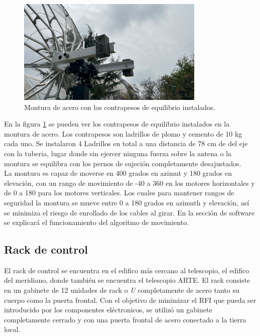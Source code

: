 \begin{figure}
    \centering
    \includegraphics[width=0.8\textwidth]{img/contrapesos}
    \caption{Montura de acero con los contrapesos de equilibrio instalados.}
    \label{fig:ensamble11}
\end{figure}

En la figura \ref{fig:ensamble11} se pueden ver los contrapesos de equilibrio instalados en la montura de acero. Los contrapesos son ladrillos de plomo y cemento de 10 kg cada uno. Se instalaron 4 Ladrillos en total a una distancia de 78 cm de del eje con la tuberia, lugar donde sin ejercer ninguna fuerza sobre la antena o la montura se equilibra con los pernos de sujeción completamente desajustados.\\

La montura es capaz de moverse en 400 grados en azimut y 180 grados en elevación, con un rango de movimiento de -40 a 360 en los motores horizontales y de 0 a 180 para los motores verticales. Los cuales para mantener rangos de seguridad la montura se mueve entre 0 a 180 grados en azimuth y elevación, así se minimiza el riesgo de enrollado de los cables al girar. En la sección de software se explicará el funcionamiento del algoritmo de movimiento.\\

\subsection{Rack de control}

El rack de control se encuentra en el edifico más cercano al telescopio, el edifico del meridiano, donde también se encuentra el telescopio ARTE. El rack consiste en un gabinete de 12 unidades de rack o \textit{U} completamente de acero tanto su cuerpo como la puerta frontal. Con el objetivo de minimizar el RFI que pueda ser introducido por los componentes eléctronicos, se utilizó un gabinete completamente cerrado y con una puerta frontal de acero conectado a la tierra local.\\


